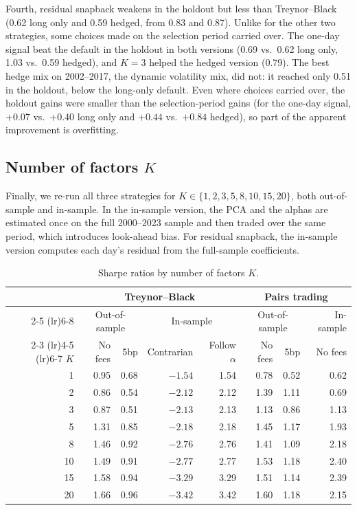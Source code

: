 \documentclass[12pt,letterpaper]{article}
\begin{document}
Fourth, residual snapback weakens in the holdout but less than Treynor--Black (0.62 long only and 0.59 hedged, from 0.83 and 0.87). Unlike for the other two strategies, some choices made on the selection period carried over. The one-day signal beat the default in the holdout in both versions (0.69 vs.\ 0.62 long only, 1.03 vs.\ 0.59 hedged), and $K = 3$ helped the hedged version (0.79). The best hedge mix on 2002--2017, the dynamic volatility mix, did not: it reached only 0.51 in the holdout, below the long-only default. Even where choices carried over, the holdout gains were smaller than the selection-period gains (for the one-day signal, $+0.07$ vs.\ $+0.40$ long only and $+0.44$ vs.\ $+0.84$ hedged), so part of the apparent improvement is overfitting.

\subsection{Number of factors $K$}

Finally, we re-run all three strategies for $K \in \{1, 2, 3, 5, 8, 10, 15, 20\}$, both out-of-sample and in-sample. In the in-sample version, the PCA and the alphas are estimated once on the full 2000--2023 sample and then traded over the same period, which introduces look-ahead bias. For residual snapback, the in-sample version computes each day's residual from the full-sample coefficients.

\begin{table}[H]
\centering
\caption{Sharpe ratios by number of factors $K$.}
\label{tab:k}
\begin{tabular}{rrrrrrrr}
\toprule
& \multicolumn{4}{c}{Treynor--Black} & \multicolumn{3}{c}{Pairs trading} \\
\cmidrule(lr){2-5} \cmidrule(lr){6-8}
& \multicolumn{2}{c}{Out-of-sample} & \multicolumn{2}{c}{In-sample} & \multicolumn{2}{c}{Out-of-sample} & In-sample \\
\cmidrule(lr){2-3} \cmidrule(lr){4-5} \cmidrule(lr){6-7}
$K$ & No fees & 5bp & Contrarian & Follow $\alpha$ & No fees & 5bp & No fees \\
\midrule
1 & 0.95 & 0.68 & $-1.54$ & 1.54 & 0.78 & 0.52 & 0.62 \\
2 & 0.86 & 0.54 & $-2.12$ & 2.12 & 1.39 & 1.11 & 0.69 \\
3 & 0.87 & 0.51 & $-2.13$ & 2.13 & 1.13 & 0.86 & 1.13 \\
5 & 1.31 & 0.85 & $-2.18$ & 2.18 & 1.45 & 1.17 & 1.93 \\
8 & 1.46 & 0.92 & $-2.76$ & 2.76 & 1.41 & 1.09 & 2.18 \\
10 & 1.49 & 0.91 & $-2.77$ & 2.77 & 1.53 & 1.18 & 2.40 \\
15 & 1.58 & 0.94 & $-3.29$ & 3.29 & 1.51 & 1.14 & 2.39 \\
20 & 1.66 & 0.96 & $-3.42$ & 3.42 & 1.60 & 1.18 & 2.15 \\
\bottomrule
\end{tabular}
\end{table}
\end{document}

